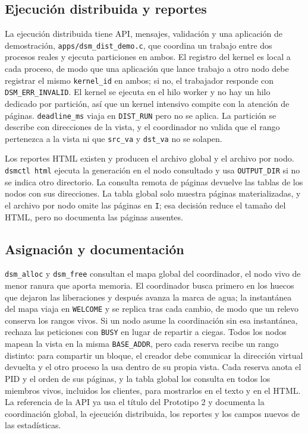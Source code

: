 \documentclass[11pt,spanish]{article}
\begin{document}
\subsection{Ejecución distribuida y reportes}

La ejecución distribuida tiene API, mensajes, validación y una aplicación de demostración, \texttt{apps/dsm\_dist\_demo.c}, que coordina un trabajo entre dos procesos reales y ejecuta particiones en ambos. El registro del kernel es local a cada proceso, de modo que una aplicación que lance trabajo a otro nodo debe registrar el mismo \texttt{kernel\_id} en ambos; si no, el trabajador responde con \texttt{DSM\_ERR\_INVALID}. El kernel se ejecuta en el hilo worker y no hay un hilo dedicado por partición, así que un kernel intensivo compite con la atención de páginas. \texttt{deadline\_ms} viaja en \texttt{DIST\_RUN} pero no se aplica. La partición se describe con direcciones de la vista, y el coordinador no valida que el rango pertenezca a la vista ni que \texttt{src\_va} y \texttt{dst\_va} no se solapen.

Los reportes HTML existen y producen el archivo global y el archivo por nodo. \texttt{dsmctl html} ejecuta la generación en el nodo consultado y usa \texttt{OUTPUT\_DIR} si no se indica otro directorio. La consulta remota de páginas devuelve las tablas de los nodos con sus direcciones. La tabla global solo muestra páginas materializadas, y el archivo por nodo omite las páginas en \texttt{I}; esa decisión reduce el tamaño del HTML, pero no documenta las páginas ausentes.

\subsection{Asignación y documentación}

\texttt{dsm\_alloc} y \texttt{dsm\_free} consultan el mapa global del coordinador, el nodo vivo de menor ranura que aporta memoria. El coordinador busca primero en los huecos que dejaron las liberaciones y después avanza la marca de agua; la instantánea del mapa viaja en \texttt{WELCOME} y se replica tras cada cambio, de modo que un relevo conserva los rangos vivos. Si un nodo asume la coordinación sin esa instantánea, rechaza las peticiones con \texttt{BUSY} en lugar de repartir a ciegas. Todos los nodos mapean la vista en la misma \texttt{BASE\_ADDR}, pero cada reserva recibe un rango distinto: para compartir un bloque, el creador debe comunicar la dirección virtual devuelta y el otro proceso la usa dentro de su propia vista. Cada reserva anota el PID y el orden de sus páginas, y la tabla global los consulta en todos los miembros vivos, incluidos los clientes, para mostrarlos en el texto y en el HTML. La referencia de la API ya usa el título del Prototipo 2 y documenta la coordinación global, la ejecución distribuida, los reportes y los campos nuevos de las estadísticas.
\end{document}
